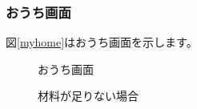 \documentclass[a4j]{jarticle}
\begin{document}
\newpage
\subsubsection{おうち画面}
図\ref{myhome}はおうち画面を示します。\\


\begin{figure}[H]
 \begin{minipage}{0.5\hsize}
   \begin{center}
   \caption{おうち画面}
   \label{myhome}
  \end{center}
 \end{minipage}
 \begin{minipage}{0.5\hsize}
  \begin{center}
   \caption{材料が足りない場合}
   \label{otukai6}
  \end{center}
 \end{minipage}
\end{figure}
\end{document}
